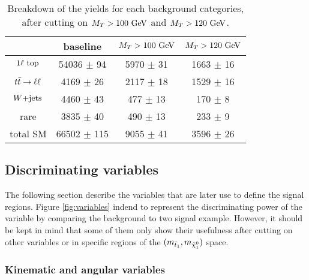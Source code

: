     \begin{table}[h!]
        \centering
        \begin{tabular}{|c|ccc|}
            \hline
                         & baseline           & $M_T > 100 ~\text{GeV}$    & $M_T > 120 ~\text{GeV}$     \\
            \hline
        $1\ell~\text{top}$  & 54036 $\pm$ 94     &  5970 $\pm$ 31      &  1663 $\pm$ 16       \\
        $t\bar{t} \rightarrow \ell \ell$   &  4169 $\pm$ 26     &  2117 $\pm$ 18      &  1529 $\pm$ 16       \\
        $\text{$W$+jets}$         &  4460 $\pm$ 43     &   477 $\pm$ 13      &   170 $\pm$ 8        \\
        rare             &  3835 $\pm$ 40     &   490 $\pm$ 13      &   233 $\pm$ 9        \\
            \hline
        total SM         & 66502 $\pm$ 115    &  9055 $\pm$ 41      &  3596 $\pm$ 26       \\
            \hline
        \end{tabular}
        \caption{Breakdown of the yields for each background categories, after cutting on $M_T > 100 ~\text{GeV}$ and $M_T > 120 ~\text{GeV}$.}
        \label{tab:MTcutImpact}
    \end{table}

        \subsection{Discriminating variables}

        The following section describe the variables that are later use to define the signal regions. Figure \ref{fig:variables} indend to represent the discriminating power of the variable by comparing the background to two signal example. However, it should be kept in mind that some of them only show their usefulness after cutting on other variables or in specific regions of the $(m_{\tilde{t}_1},m_{\tilde{\chi}_1^0})$ space.

           \subsubsection{Kinematic and angular variables}


